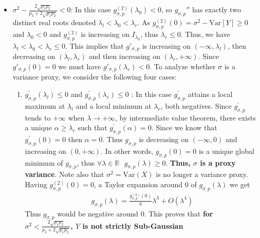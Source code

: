 \documentclass[a4paper, 10pt]{article}
\newcommand{\bea}{\begin{eqnarray}}
\newcommand{\eea}{\end{eqnarray}}
\theoremstyle{definition}
\begin{document}
\begin{itemize}
\begin{itemize}
        
        \item  $\sigma^2-\frac{2\sqrt{p_1p_2}}{p_3+2\sqrt{p_1p_2}}  < 0$: In this case $g^{(2)}_{\sigma,p}(\lambda_{0})<0$, so $g_{\sigma,p}''$ has exactly two distinct real roots denoted $\lambda_l<\lambda_0<\lambda_r$. As $g^{(2)}_{\sigma,p}(0)=\sigma^2-\text{Var}[Y] \geq 0$ and $\lambda_0 < 0$ and $g^{(2)}_{\sigma,p}$ is increasing on $I_{\lambda_0}$, thus $\lambda_r \leq 0$. Thus, we have $\lambda_l < \lambda_0  <  \lambda_r \leq 0$. This implies that $g'_{\sigma,p}$ is increasing on  $(-\infty, \lambda_l)$, then decreasing on $(\lambda_l, \lambda_r)$ and then increasing on $(\lambda_r, +\infty)$. Since $g'_{\sigma,p}(0)=0$ we must have $g'_{\sigma,p}(\lambda_r)<0$. To analyze whether $\sigma$ is a variance proxy, we consider the following four cases:
        \begin{enumerate}
            \item  $g^{'}_{\sigma,p}(\lambda_l) \leq 0$ and $g^{'}_{\sigma,p}(\lambda_r)\leq 0$
            : In this case $g^{'}_{\sigma, p}$ attains a local maximum at $\lambda_l$ and a local minimum at $\lambda_r$, both negatives. Since $g^{'}_{\sigma, p}$  tends to $+\infty$ when  $\lambda\to +\infty$, by intermediate value theorem, there exists a unique $\alpha \geq \lambda_r$ such that $g^{'}_{\sigma, p}(\alpha)=0$. Since we know that $g^{'}_{\sigma, p}(0)=0$ then  $\alpha=0$. Thus $g_{\sigma, p}$ is decreasing on $(-\infty,0)$ and increasing on $(0,+\infty)$. In other words, $g_{\sigma, p}(0)=0$ is a unique global minimum of $g_{\sigma,p}$, thus $\forall \lambda \in \mathbb{R} \ \ \ g_{\sigma,p}(\lambda) \geq 0 $. \textbf{Thus, $\sigma$ is a proxy variance}. %
            Note also that $\sigma^2 = \text{Var}(X)$ is no longer a variance proxy. Having $g^{(2)}_{\sigma, p}(0)=0$, a Taylor expansion around 0 of $g_{\sigma, p}(\lambda)$ we get
            \bea g_{\sigma, p}(\lambda) = \frac{g^{(3)}_{\sigma,p}(0)}{6}\lambda^3 + O(\lambda^4) \eea
            Thus $g_{\sigma, p}$ would be negative around 0. This proves that  \textbf{for $\sigma^2<\frac{2\sqrt{p_1p_2}}{p_3+2\sqrt{p_1p_2}}$, $Y$ is not strictly Sub-Gaussian}  
            

\end{enumerate}
\end{itemize}
\end{itemize}
\end{document}
